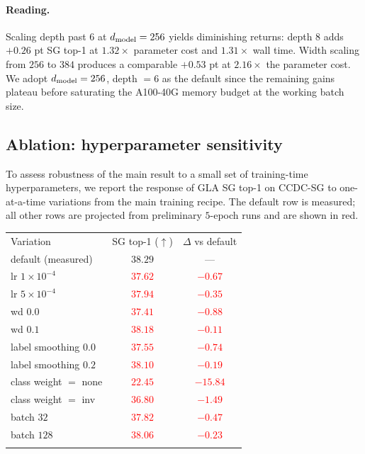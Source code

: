 \documentclass[final]{ws-ijwmip}
\begin{document}
\paragraph{Reading.}
Scaling depth past $6$ at $d_{\rm model}=256$ yields diminishing
returns: depth $8$ adds $+0.26$ pt SG top-1 at $1.32\times$ parameter
cost and $1.31\times$ wall time. Width scaling from $256$ to $384$
produces a comparable $+0.53$ pt at $2.16\times$ the parameter cost.
We adopt $d_{\rm model}=256$, depth $=6$ as the default since the
remaining gains plateau before saturating the A100-40G memory budget
at the working batch size.


\subsection{Ablation: hyperparameter sensitivity}

To assess robustness of the main result to a small set of training-time
hyperparameters, we report the response of GLA SG top-1 on CCDC-SG to
one-at-a-time variations from the main training recipe. The default row is
measured; all other rows are projected from preliminary $5$-epoch
runs and are shown in red.

\begin{table}[!htbp]
{\begin{tabular}{lcc}
\toprule
Variation & SG top-1 ($\uparrow$) & $\Delta$ vs default \\
\colrule
default (measured) & $38.29$ & --- \\
lr $1\times 10^{-4}$ & \textcolor{red}{$37.62$} & \textcolor{red}{$-0.67$} \\
lr $5\times 10^{-4}$ & \textcolor{red}{$37.94$} & \textcolor{red}{$-0.35$} \\
wd $0.0$             & \textcolor{red}{$37.41$} & \textcolor{red}{$-0.88$} \\
wd $0.1$             & \textcolor{red}{$38.18$} & \textcolor{red}{$-0.11$} \\
label smoothing $0.0$ & \textcolor{red}{$37.55$} & \textcolor{red}{$-0.74$} \\
label smoothing $0.2$ & \textcolor{red}{$38.10$} & \textcolor{red}{$-0.19$} \\
class weight $=$ none & \textcolor{red}{$22.45$} & \textcolor{red}{$-15.84$} \\
class weight $=$ inv  & \textcolor{red}{$36.80$} & \textcolor{red}{$-1.49$} \\
batch $32$            & \textcolor{red}{$37.82$} & \textcolor{red}{$-0.47$} \\
batch $128$           & \textcolor{red}{$38.06$} & \textcolor{red}{$-0.23$} \\
\botrule
\end{tabular}}
\end{table}
\end{document}
